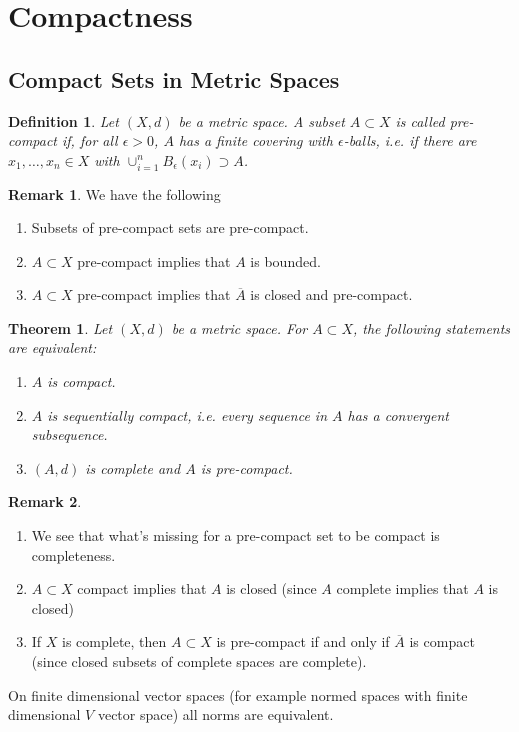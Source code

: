 \documentclass[11pt,a4paper]{article}
\newtheorem{thm}{Theorem}[section]
\newtheorem{defn}{Definition}[section]
\theoremstyle{definition}
\newtheorem{rem}{Remark}[section]
\begin{document}
\section{Compactness}
\subsection{Compact Sets in Metric Spaces}
\begin{defn} Let $(X,d)$ be a metric space. A subset $A \subset X$ is called pre-compact if, for all $\epsilon >0$, $A$ has a finite covering with $\epsilon$-balls, i.e. if there are $x_1, \dots , x_n \in X$ with $\cup_{i=1}^n B_\epsilon(x_i) \supset A$. 
\end{defn}
\begin{rem} We have the following
\begin{enumerate}
\item Subsets of pre-compact sets are pre-compact.
\item $A \subset X$ pre-compact implies that $A$ is bounded.
\item $A \subset X$ pre-compact implies that $\overline{A}$ is closed and pre-compact. 
\end{enumerate}
\end{rem}
\begin{thm} Let $(X,d)$ be a metric space. For $A \subset X$, the following statements are equivalent:
\begin{enumerate}
\item $A$ is compact.
\item $A$ is sequentially compact, i.e. every sequence in $A$ has a convergent subsequence.
\item $(A,d)$ is complete and $A$ is pre-compact. 
\end{enumerate}
\end{thm}
\begin{rem} \ \begin{enumerate}
\item We see that what's missing for a pre-compact set to be compact is completeness. 
\item $A \subset X$ compact implies that $A$ is closed (since $A$ complete implies that $A$ is closed)
\item If $X$ is complete, then $A \subset X$ is pre-compact if and only if $\overline{A}$ is compact (since closed subsets of complete spaces are complete). 
\end{enumerate}
\end{rem}
\noindent On finite dimensional vector spaces (for example normed spaces with finite dimensional $V$ vector space) all norms are equivalent. 
\end{document}
